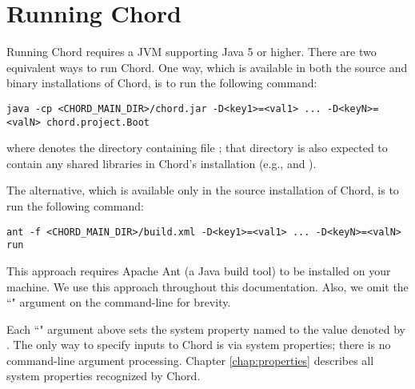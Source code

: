 \section{Running Chord}
\label{sec:running-chord}

Running Chord requires a JVM supporting Java 5 or higher.  There are two equivalent ways to run Chord.
One way, which is available in both the source and binary installations of Chord, is to run the following command:

\begin{framed}
\begin{verbatim}
java -cp <CHORD_MAIN_DIR>/chord.jar -D<key1>=<val1> ... -D<keyN>=<valN> chord.project.Boot
\end{verbatim}
\end{framed}

where  denotes the directory containing file ; that directory is also expected
to contain any shared libraries in Chord's installation (e.g.,  and ).

The alternative, which is available only in the source installation of Chord, is to run the following command:

\begin{framed}
\begin{verbatim}
ant -f <CHORD_MAIN_DIR>/build.xml -D<key1>=<val1> ... -D<keyN>=<valN> run
\end{verbatim}
\end{framed}

This approach requires Apache Ant (a Java build tool) to be installed on your machine.  We use this approach 
throughout this documentation.  Also, we omit the ``" argument on the command-line for brevity.

Each ``" argument above sets the system property named  to the value denoted by .  The only way
to specify inputs to Chord is via system properties; there is no command-line argument processing.  Chapter \ref{chap:properties} describes
all system properties recognized by Chord.

